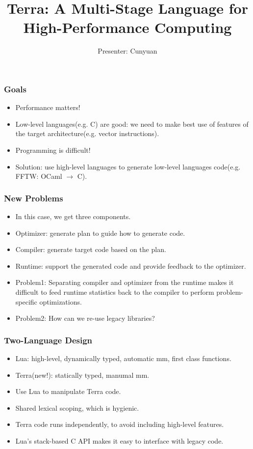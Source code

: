 \documentclass{beamer}
\begin{document}
\title{Terra: A Multi-Stage Language for High-Performance Computing}
\author{Presenter: Cunyuan}

\maketitle

\def\LArr{\xrightarrow[]{L}}
\def\SArr{\xrightarrow[]{S}}
\def\TArr{\xrightarrow[]{T}}
\def\ude#1{\underline{\dot{#1}}}

\begin{frame}
	\frametitle{Goals}
  \begin{itemize}
  \item Performance matters!\pause
  \item Low-level languages(e.g. C) are good: we need to make best use of features of the target architecture(e.g. vector instructions).\pause
  \item Programming is difficult!\pause
  \item Solution: use high-level languages to generate low-level languages code(e.g. FFTW: OCaml $\rightarrow$ C).
  \end{itemize}
\end{frame}

\begin{frame}
	\frametitle{New Problems}
  \begin{itemize}
  \item In this case, we get three components.\pause
  \item Optimizer: generate plan to guide how to generate code.\pause
  \item Compiler: generate target code based on the plan.\pause
  \item Runtime: support the generated code and provide feedback to the optimizer.\pause
  \item Problem1: Separating compiler and optimizer from the runtime makes it difficult to feed runtime statistics back to the compiler to perform problem-specific optimizations.\pause
  \item Problem2: How can we re-use legacy libraries?
  \end{itemize}
\end{frame}

\begin{frame}
  \frametitle{Two-Language Design}
  \begin{itemize}
  \item Lua: high-level, dynamically typed, automatic mm, first class functions.\pause
  \item Terra(new!): statically typed, manumal mm.\pause
  \item Use Lua to manipulate Terra code.\pause
  \item Shared lexical scoping, which is hygienic.\pause
  \item Terra code runs independently, to avoid including high-level features.\pause
  \item Lua's stack-based C API makes it easy to interface with legacy code.
  \end{itemize}
\end{frame}
\end{document}
